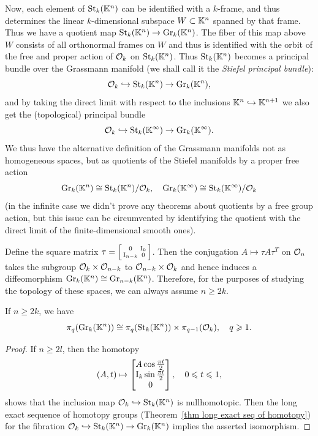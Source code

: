 Now, each element of $\operatorname{St}_k(\mathbb{K}^n)$ can be identified with a $k$-frame, and thus determines the linear $k$-dimensional subspace $W\subset \mathbb{K}^n$ spanned by that frame. Thus we have a quotient map $\operatorname{St}_k(\mathbb{K}^n)\to \operatorname{Gr}_k(\mathbb{K}^n)$. The fiber of this map above $W$ consists of all orthonormal frames on $W$ and thus is identified with the orbit of the free and proper action of $\mathcal{O}_k$ on $\operatorname{St}_k(\mathbb{K}^n)$. Thus $\operatorname{St}_k(\mathbb{K}^n)$ becomes a principal bundle over the Grassmann manifold (we shall call it the \emph{Stiefel principal bundle}):
\[\mathcal{O}_k\hookrightarrow \operatorname{St}_k(\mathbb{K}^n)\to \operatorname{Gr}_k(\mathbb{K}^n),\label{eq Stiefel pfb}\]
and by taking the direct limit with respect to the inclusions $\mathbb{K}^n\hookrightarrow \mathbb{K}^{n+1}$ we also get the (topological) principal bundle
\[\mathcal{O}_k\hookrightarrow \operatorname{St}_k(\mathbb{K}^\infty)\to \operatorname{Gr}_k(\mathbb{K}^\infty).\]
We thus have the alternative definition of the Grassmann manifolds not as homogeneous spaces, but as quotients of the Stiefel manifolds by a proper free action
\[\operatorname{Gr}_k(\mathbb{K}^n)\cong \operatorname{St}_k(\mathbb{K}^n)\slash \mathcal{O}_k, \quad \operatorname{Gr}_k(\mathbb{K}^\infty)\cong \operatorname{St}_k(\mathbb{K}^\infty)\slash \mathcal{O}_k\]
(in the infinite case we didn't prove any theorems about quotients by a free group action, but this issue can be circumvented by identifying the quotient with the direct limit of the finite-dimensional smooth ones).




\begin{rem}
   Define the square matrix $\tau=\left[\begin{smallmatrix}
       0&\mathrm{I}_k\\\mathrm{I}_{n-k}&0
   \end{smallmatrix}\right]$. 
   Then the conjugation $A\mapsto \tau A\tau^T$ on $\mathcal{O}_n$ takes the subgroup $\mathcal{O}_k\times\mathcal{O}_{n-k}$ to $\mathcal{O}_{n-k}\times\mathcal{O}_{k}$ and hence induces a diffeomorphism $\operatorname{Gr}_k(\mathbb{K}^n)\cong \operatorname{Gr}_{n-k}(\mathbb{K}^n)$. Therefore, for the purposes of studying the topology of these spaces, we can always assume $n\geq 2k$.
\end{rem}


\begin{prop}\label{prop 10.9.5 Shastri}
    If $n\geq 2k$, we have
    \[\pi_q(\operatorname{Gr}_k(\mathbb{K}^n))\cong \pi_q(\operatorname{St}_k(\mathbb{K}^n))\times \pi_{q-1}(\mathcal{O}_k),\quad q\geqslant 1.\]
\end{prop}
\begin{proof}
    If $n\geq 2l$, then the homotopy
\[(A,t)\mapsto \begin{bmatrix}
    A\cos\frac{\pi t}{2}\\
    \mathrm{I}_k \sin\frac{\pi t}{2}\\
    0
\end{bmatrix},\quad 0\leqslant t\leqslant 1,\]
shows that the inclusion map $\mathcal{O}_k\hookrightarrow \operatorname{St}_{k}(\mathbb{K}^n)$ is nullhomotopic. Then the long exact sequence of homotopy groups (Theorem~\ref{thm long exact seq of homotopy}) for the fibration $\mathcal{O}_k\hookrightarrow \operatorname{St}_k(\mathbb{K}^n)\to \operatorname{Gr}_k(\mathbb{K}^n)$ implies the asserted isomorphism.
\end{proof}

